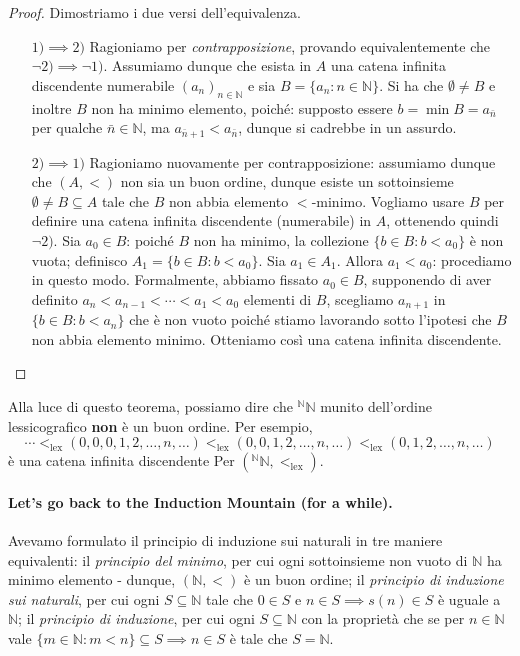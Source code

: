 \documentclass[fontsize = 11 pt, paper=A4, oneside, index=totoc, hyperref]{article}
\theoremstyle{definition}
\theoremstyle{plain}
\newcommand{\N}{\mathbb{N}}
\begin{document}
\begin{proof}
  Dimostriamo i due versi dell'equivalenza.
  \begin{itemize}
    \item[\(1) \implies 2)\)] Ragioniamo per \emph{contrapposizione}, provando equivalentemente che \(\lnot 2) \implies \lnot 1)\). Assumiamo dunque che esista in \(A\) una catena infinita discendente numerabile \((a_n)_{n \in \N}\) e sia \(B = \lbrace a_n \colon n \in \N \rbrace\). Si ha che \(\emptyset \neq B\) e inoltre \(B\) non ha minimo elemento, poiché: supposto essere \(b = \min B = a_{\bar{n}}\) per qualche \(\bar{n} \in \N\), ma \(a_{\bar{n}+1} < a_{\bar{n}}\), dunque si cadrebbe in un assurdo.
    \item[\(2) \implies 1)\)] Ragioniamo nuovamente per contrapposizione: assumiamo dunque che \((A,<)\) non sia un buon ordine, dunque esiste un sottoinsieme \(\emptyset \neq B \subseteq A\) tale che \(B\) non abbia elemento \(<\)-minimo. Vogliamo usare \(B\) per definire una catena infinita discendente (numerabile) in \(A\), ottenendo quindi \(\lnot 2)\). Sia \(a_0 \in B\): poiché \(B\) non ha minimo, la collezione \(\lbrace b \in B \colon b < a_0\rbrace\) è non vuota; definisco \(A_1 = \lbrace b \in B \colon b < a_0\rbrace\). Sia \(a_1 \in A_1\). Allora \(a_1 < a_0\): procediamo in questo modo. Formalmente, abbiamo fissato \(a_0 \in B\), supponendo di aver definito \(a_n < a_{n-1} < \dotsb < a_1 < a_0\) elementi di \(B\), scegliamo \(a_{n+1}\) in \(\lbrace b \in B \colon b < a_n\rbrace\) che è non vuoto poiché stiamo lavorando sotto l'ipotesi che \(B\) non abbia elemento minimo. Otteniamo così una catena infinita discendente.
  \end{itemize}
\end{proof}
Alla luce di questo teorema, possiamo dire che \({}^\N\N\) munito dell'ordine lessicografico {\bf non} è un buon ordine. Per esempio,
\[
\dotsb <_{\mathrm{lex}} (0,0,0,1,2,\dots,n,\dots) <_{\mathrm{lex}} (0,0,1,2,\dots,n,\dots) <_{\mathrm{lex}} (0,1,2,\dots,n,\dots)
\]
è una catena infinita discendente Per \(({}^\N\N,<_{\mathrm{lex}})\).

\paragraph{Let's go back to the Induction Mountain (for a while).} Avevamo formulato il principio di induzione sui naturali in tre maniere equivalenti: il \emph{principio del minimo}, per cui ogni sottoinsieme non vuoto di \(\N\) ha minimo elemento - dunque, \((\N, <)\) è un buon ordine; il \emph{principio di induzione sui naturali}, per cui ogni \(S \subseteq \N\) tale che \(0 \in S\) e \(n \in S \implies s(n) \in S\) è uguale a \(\N\); il \emph{principio di induzione}, per cui ogni \(S \subseteq \N\) con la proprietà che se per \(n \in \N\) vale \(\lbrace m \in \N \colon m < n \rbrace \subseteq S \implies n \in S\) è tale che \(S = \N\).
\end{document}

